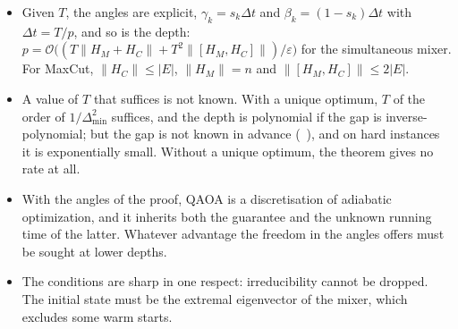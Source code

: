 \documentclass[handoutsbeamer.tex]{subfiles}
\begin{document}
\begin{frame}
\onp{\footnotesize}
\begin{itemize}\setlength\itemsep{0.3em}
    \item Given $T$, the angles are explicit, $\gamma_k = s_k\Delta t$ and $\beta_k = (1-s_k)\Delta t$ with $\Delta t = T/p$, and so is the depth: $p = \mathcal O\big((T\|H_M + H_C\| + T^2\|[H_M,H_C]\|)/\varepsilon\big)$ for the simultaneous mixer. For MaxCut, $\|H_C\|\le|E|$, $\|H_M\| = n$ and $\|[H_M,H_C]\|\le2|E|$.
    \item A value of $T$ that suffices is not known. With a unique optimum, $T$ of the order of $1/\Delta_{\min}^2$ suffices, and the depth is polynomial if the gap is inverse-polynomial; but the gap is not known in advance (\Chap~), and on hard instances it is exponentially small. Without a unique optimum, the theorem gives no rate at all.
    \item With the angles of the proof, QAOA is a discretisation of adiabatic optimization, and it inherits both the guarantee and the unknown running time of the latter. Whatever advantage the freedom in the angles offers must be sought at lower depths.
    \item The conditions are sharp in one respect: irreducibility cannot be dropped. The initial state must be the extremal eigenvector of the mixer, which excludes some warm starts.
\end{itemize}
\end{frame}
\end{document}
